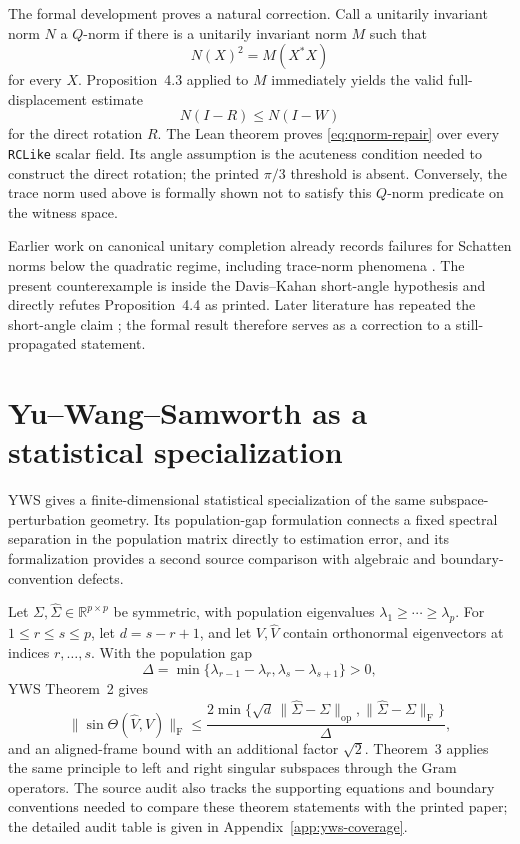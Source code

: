 \documentclass[11pt]{article}
\begin{document}
The formal development proves a natural correction.  Call a unitarily invariant
norm $N$ a $Q$-norm if there is a unitarily invariant norm $M$ such that
\begin{equation}
  N(X)^2=M(X^*X)
  \label{eq:qnorm-def}
\end{equation}
for every $X$.  Proposition~4.3 applied to $M$ immediately yields the valid
full-displacement estimate
\begin{equation}
  N(I-R)\leq N(I-W)
  \label{eq:qnorm-repair}
\end{equation}
for the direct rotation $R$.  The Lean theorem proves
\cref{eq:qnorm-repair} over every \texttt{RCLike} scalar field.  Its angle
assumption is the acuteness condition needed to construct the direct rotation;
the printed $\pi/3$ threshold is absent.  Conversely, the trace norm used above is formally shown not
to satisfy this $Q$-norm predicate on the witness space.

Earlier work on canonical unitary completion already records failures for
Schatten norms below the quadratic regime, including trace-norm phenomena
\citep{bolotnikov2001minimal}.  The present counterexample is inside the
Davis--Kahan short-angle hypothesis and directly refutes Proposition~4.4 as
printed.  Later literature has repeated the short-angle claim
\citep{qiu2006grassmann}; the formal result therefore serves as a correction to
a still-propagated statement.

\section{Yu--Wang--Samworth as a statistical specialization}
\label{sec:yws}

YWS gives a finite-dimensional statistical specialization of the same
subspace-perturbation geometry.  Its population-gap formulation connects a
fixed spectral separation in the population matrix directly to estimation
error, and its formalization provides a second source comparison with algebraic
and boundary-convention defects.

Let $\Sigma,\widehat\Sigma\in\mathbb{R}^{p\times p}$ be symmetric, with
population eigenvalues $\lambda_1\ge\cdots\ge\lambda_p$.  For
$1\le r\le s\le p$, let $d=s-r+1$, and let $V,\widehat V$ contain orthonormal
eigenvectors at indices $r,\ldots,s$.  With the population gap
\[
  \Delta=
  \min\{\lambda_{r-1}-\lambda_r,\lambda_s-\lambda_{s+1}\}>0,
\]
YWS Theorem~2 gives
\begin{equation}
  \|\sin\Theta(\widehat V,V)\|_{\mathrm F}
  \le
  \frac{2\min\{\sqrt d\,\|\widehat\Sigma-\Sigma\|_{\mathrm{op}},
                    \|\widehat\Sigma-\Sigma\|_{\mathrm F}\}}
       {\Delta},
  \label{eq:yws-sintheta}
\end{equation}
and an aligned-frame bound with an additional factor $\sqrt2$.  Theorem~3
applies the same principle to left and right singular subspaces through the Gram
operators.  The source audit also tracks the supporting equations and boundary
conventions needed to compare these theorem statements with the printed paper;
the detailed audit table is given in Appendix~\ref{app:yws-coverage}.
\end{document}
